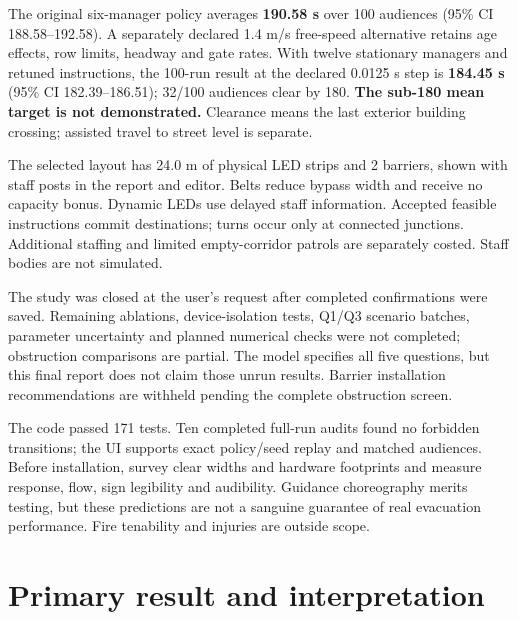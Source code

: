 \documentclass[11pt,a4paper]{article}
\begin{document}
The original six-manager policy averages \textbf{190.58 s} over 100 audiences (95\% CI 188.58–192.58). A separately declared 1.4 m/s free-speed alternative retains age effects, row limits, headway and gate rates. With twelve stationary managers and retuned instructions, the 100-run result at the declared 0.0125 s step is \textbf{184.45 s} (95\% CI 182.39–186.51); 32/100 audiences clear by 180. \textbf{The sub-180 mean target is not demonstrated.} Clearance means the last exterior building crossing; assisted travel to street level is separate.


The selected layout has 24.0 m of physical LED strips and 2 barriers, shown with staff posts in the report and editor. Belts reduce bypass width and receive no capacity bonus. Dynamic LEDs use delayed staff information. Accepted feasible instructions commit destinations; turns occur only at connected junctions. Additional staffing and limited empty-corridor patrols are separately costed. Staff bodies are not simulated.


The study was closed at the user’s request after completed confirmations were saved. Remaining ablations, device-isolation tests, Q1/Q3 scenario batches, parameter uncertainty and planned numerical checks were not completed; obstruction comparisons are partial. The model specifies all five questions, but this final report does not claim those unrun results. Barrier installation recommendations are withheld pending the complete obstruction screen.


The code passed 171 tests. Ten completed full-run audits found no forbidden transitions; the UI supports exact policy/seed replay and matched audiences. Before installation, survey clear widths and hardware footprints and measure response, flow, sign legibility and audibility. Guidance choreography merits testing, but these predictions are not a sanguine guarantee of real evacuation performance. Fire tenability and injuries are outside scope.
\clearpage
{}
{\small\tableofcontents}
\clearpage
{}
\section{Primary result and interpretation}
\end{document}
